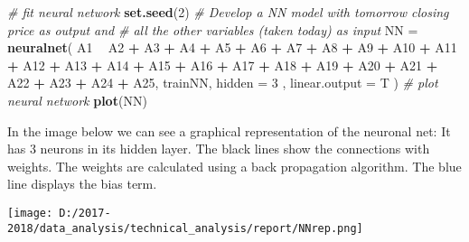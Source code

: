 \documentclass[
  11pt,
]{article}
\newenvironment{Shaded}{\begin{snugshade}}{\end{snugshade}}
\newcommand{\CommentTok}[1]{\textcolor[rgb]{0.56,0.35,0.01}{\textit{#1}}}
\newcommand{\DataTypeTok}[1]{\textcolor[rgb]{0.13,0.29,0.53}{#1}}
\newcommand{\DecValTok}[1]{\textcolor[rgb]{0.00,0.00,0.81}{#1}}
\newcommand{\KeywordTok}[1]{\textcolor[rgb]{0.13,0.29,0.53}{\textbf{#1}}}
\newcommand{\NormalTok}[1]{#1}
\newcommand{\OperatorTok}[1]{\textcolor[rgb]{0.81,0.36,0.00}{\textbf{#1}}}
\newcommand{\StringTok}[1]{\textcolor[rgb]{0.31,0.60,0.02}{#1}}
\let\origfigure\figure
\let\endorigfigure\endfigure
\renewenvironment{figure}[1][2] {
    \expandafter\origfigure\expandafter[H]
} {
    \endorigfigure
}
\begin{document}
\begin{Shaded}
\begin{Highlighting}[]
\CommentTok{# fit neural network}
\KeywordTok{set.seed}\NormalTok{(}\DecValTok{2}\NormalTok{)}
\CommentTok{# Develop a NN model with tomorrow closing price as output and}
\CommentTok{# all the other variables (taken today) as input}
\NormalTok{NN =}\StringTok{ }\KeywordTok{neuralnet}\NormalTok{( A1 }\OperatorTok{~}\StringTok{ }\NormalTok{A2 }\OperatorTok{+}\StringTok{ }\NormalTok{A3 }\OperatorTok{+}\StringTok{ }\NormalTok{A4 }\OperatorTok{+}\StringTok{ }\NormalTok{A5 }\OperatorTok{+}\StringTok{ }\NormalTok{A6 }\OperatorTok{+}\StringTok{ }\NormalTok{A7 }\OperatorTok{+}\StringTok{ }\NormalTok{A8 }\OperatorTok{+}\StringTok{ }\NormalTok{A9 }\OperatorTok{+}\StringTok{ }\NormalTok{A10}
\OperatorTok{+}\StringTok{ }\NormalTok{A11 }\OperatorTok{+}\StringTok{ }\NormalTok{A12 }\OperatorTok{+}\StringTok{ }\NormalTok{A13 }\OperatorTok{+}\StringTok{ }\NormalTok{A14 }\OperatorTok{+}\StringTok{ }\NormalTok{A15 }\OperatorTok{+}\StringTok{ }\NormalTok{A16 }\OperatorTok{+}\StringTok{ }\NormalTok{A17 }\OperatorTok{+}\StringTok{ }\NormalTok{A18 }\OperatorTok{+}\StringTok{ }\NormalTok{A19 }\OperatorTok{+}\StringTok{ }\NormalTok{A20 }\OperatorTok{+}\StringTok{ }\NormalTok{A21}
\OperatorTok{+}\StringTok{ }\NormalTok{A22 }\OperatorTok{+}\StringTok{ }\NormalTok{A23 }\OperatorTok{+}\StringTok{ }\NormalTok{A24 }\OperatorTok{+}\StringTok{ }\NormalTok{A25, trainNN, }\DataTypeTok{hidden =} \DecValTok{3}\NormalTok{ , }\DataTypeTok{linear.output =}\NormalTok{ T ) }
\CommentTok{# plot neural network}
\KeywordTok{plot}\NormalTok{(NN)}
\end{Highlighting}
\end{Shaded}

In the image below we can see a graphical representation of the neuronal
net: It has 3 neurons in its hidden layer. The black lines show the
connections with weights. The weights are calculated using a back
propagation algorithm. The blue line displays the bias term.

\begin{figure}
\centering
\texttt{[image: D:/2017-2018/data\_analysis/technical\_analysis/report/NNrep.png]}
\caption{Neuronal net representation}
\end{figure}
\end{document}
